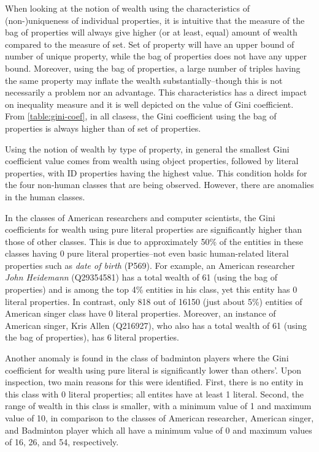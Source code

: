 When looking at the notion of wealth using the characteristics of (non-)uniqueness of individual properties, it is intuitive that the measure of the bag of properties will always give higher (or at least, equal) amount of wealth compared to the measure of set. Set of property will have an upper bound of number of unique property, while the bag of properties does not have any upper bound. Moreover, using the bag of properties, a large number of triples having the same property may inflate the wealth substantially--though this is not necessarily a problem nor an advantage. This characteristics has a direct impact on inequality measure and it is well depicted on the value of Gini coefficient. From \autoref{table:gini-coef}, in all clasess, the Gini coefficient using the bag of properties is always higher than of set of properties.

Using the notion of wealth by type of property, in general the smallest Gini coefficient value comes from wealth using object properties, followed by literal properties, with ID properties having the highest value. This condition holds for the four non-human classes that are being observed. However, there are anomalies in the human classes.

In the classes of American researchers and computer scientists, the Gini coefficients for wealth using pure literal properties are significantly higher than those of other classes. This is due to approximately 50\% of the entities in these classes having 0 pure literal properties--not even basic human-related literal properties such as \textit{date of birth} (P569). For example, an American researcher \textit{John Heidemann} (Q29354581) has a total wealth of 61 (using the bag of properties) and is among the top 4\% entities in his class, yet this entity has 0 literal properties. In contrast, only 818 out of 16150 (just about 5\%) entities of American singer class have 0 literal properties. Moreover, an instance of American singer, {Kris Allen} (Q216927), who also has a total wealth of 61 (using the bag of properties), has 6 literal properties.

Another anomaly is found in the class of badminton players where the Gini coefficient for wealth using pure literal is significantly lower than others'. Upon inspection, two main reasons for this were identified. First, there is no entity in this class with 0 literal properties; all entites have at least 1 literal. Second, the range of wealth in this class is smaller, with a minimum value of 1 and maximum value of 10, in comparison to the classes of American researcher, American singer, and Badminton player which all have a minimum value of 0 and maximum values of 16, 26, and 54, respectively.

